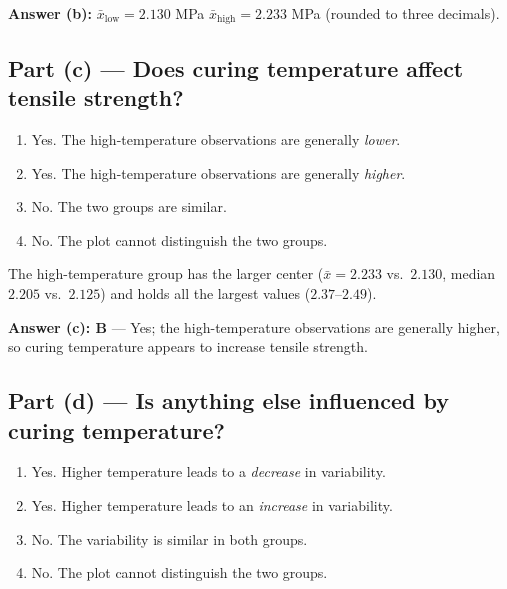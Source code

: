 \documentclass[11pt]{article}
\begin{document}
\begin{answerbox}
\textbf{Answer (b):}\quad
$\bar{x}_{\text{low}} = 2.130$ MPa \qquad
$\bar{x}_{\text{high}} = 2.233$ MPa \quad(rounded to three decimals).
\end{answerbox}

\subsection*{Part (c) — Does curing temperature affect tensile strength?}

\noindent
\begin{enumerate}[label=\textbf{\Alph*.},leftmargin=2.2em,itemsep=2pt]
  \item Yes. The high-temperature observations are generally \emph{lower}.
  \item Yes. The high-temperature observations are generally \emph{higher}.
  \item No. The two groups are similar.
  \item No. The plot cannot distinguish the two groups.
\end{enumerate}

\noindent
The high-temperature group has the larger center ($\bar{x}=2.233$ vs.\ $2.130$,
median $2.205$ vs.\ $2.125$) and holds all the largest values ($2.37$–$2.49$).

\begin{answerbox}
\textbf{Answer (c): B} --- Yes; the high-temperature observations are generally
higher, so curing temperature appears to increase tensile strength.
\end{answerbox}

\subsection*{Part (d) — Is anything else influenced by curing temperature?}

\noindent
\begin{enumerate}[label=\textbf{\Alph*.},leftmargin=2.2em,itemsep=2pt]
  \item Yes. Higher temperature leads to a \emph{decrease} in variability.
  \item Yes. Higher temperature leads to an \emph{increase} in variability.
  \item No. The variability is similar in both groups.
  \item No. The plot cannot distinguish the two groups.
\end{enumerate}
\end{document}
